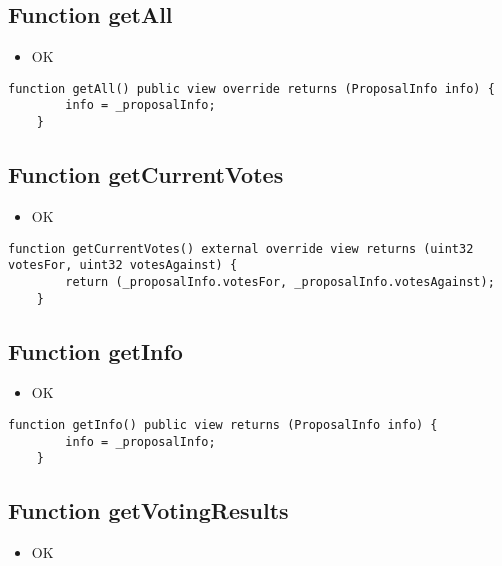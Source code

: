 \subsection{Function getAll}

\begin{itemize}
\item OK
\end{itemize}

\begin{lstlisting}[firstnumber=168]
    function getAll() public view override returns (ProposalInfo info) {
        info = _proposalInfo;
    }
\end{lstlisting}

\subsection{Function getCurrentVotes}

\begin{itemize}
\item OK
\end{itemize}

\begin{lstlisting}[firstnumber=181]
    function getCurrentVotes() external override view returns (uint32 votesFor, uint32 votesAgainst) {
        return (_proposalInfo.votesFor, _proposalInfo.votesAgainst);
    }
\end{lstlisting}

\subsection{Function getInfo}

\begin{itemize}
\item OK
\end{itemize}

\begin{lstlisting}[firstnumber=177]
    function getInfo() public view returns (ProposalInfo info) {
        info = _proposalInfo;
    }
\end{lstlisting}

\subsection{Function getVotingResults}

\begin{itemize}
\item OK
\end{itemize}

